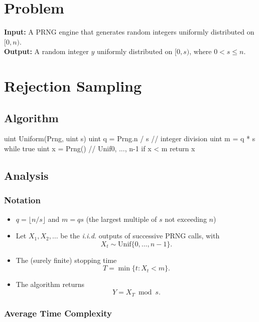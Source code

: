 \documentclass[12pt]{article}
\begin{document}
\section{Problem}

\textbf{Input:} A PRNG engine that generates random integers uniformly distributed on \([0, n)\). \\
\textbf{Output:} A random integer \(y\) uniformly distributed on \([0, s)\), where \(0 < s \leq n\).

\section{Rejection Sampling}

\subsection{Algorithm}

\begin{pseudocode}
uint Uniform(Prng, uint s)
    uint q = Prng.n / s     // integer division
    uint m = q * s
    while true
        uint x = Prng()     // Unif{0, ..., n-1}
        if x < m
            return x %
\end{pseudocode}

\subsection{Analysis}

\subsubsection{Notation}

\begin{itemize}
    \item \(q = \lfloor n / s \rfloor\) and \(m = qs\) (the largest multiple of \(s\) not exceeding \(n\))
    \item Let \(X_1, X_2, \dots\) be the \textit{i.i.d.} outputs of successive PRNG calls, with
    \[
        X_t \sim \mathrm{Unif}\{0, \dots, n-1\}.
    \]
    \item The (surely finite) stopping time
    \[
        T = \min\{t : X_t < m\}.
    \]
    \item The algorithm returns
    \[
        Y = X_T \bmod s.
    \]
\end{itemize}

\subsubsection{Average Time Complexity}
\end{document}
